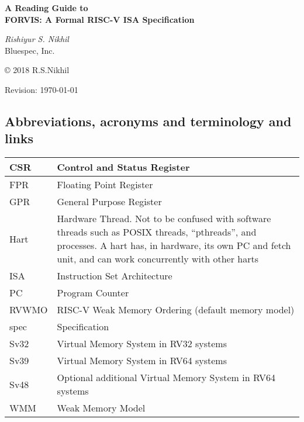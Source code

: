 \documentclass[11pt]{article}
\begin{document}

\pagestyle{empty}

\begin{center}

\vspace*{1.5in}

{\LARGE\bf A Reading Guide to} \\
{\LARGE\bf FORVIS: A Formal RISC-V ISA Specification}

\vspace{2cm}

{\Large \emph{Rishiyur S. Nikhil}} \\

Bluespec, Inc.


\vspace{0.5in}

\copyright{} 2018 R.S.Nikhil

\vspace{1in}

Revision: \today

\end{center}


\newpage



\subsection*{Abbreviations, acronyms and terminology and links}

\begin{tabular}{|l|p{4.5in}|}
\hline
CSR   & Control and Status Register \\
\hline
FPR   & Floating Point Register \\
\hline
GPR   & General Purpose Register \\
\hline
Hart  & Hardware Thread.  Not to be confused with software threads
         such as POSIX threads, ``pthreads'', and processes.
	 A hart has, in hardware, its own PC and fetch unit,
	 and can work concurrently with other harts \\
\hline
ISA   & Instruction Set Architecture \\
\hline
PC    & Program Counter \\
\hline
RVWMO & RISC-V Weak Memory Ordering (default memory model) \\
\hline
spec  & Specification \\
\hline
Sv32  & Virtual Memory System in RV32 systems \\
\hline
Sv39  & Virtual Memory System in RV64 systems \\
\hline
Sv48  & Optional additional Virtual Memory System in RV64 systems \\
\hline
WMM  & Weak Memory Model \\
\hline
\end{tabular}
\end{document}
